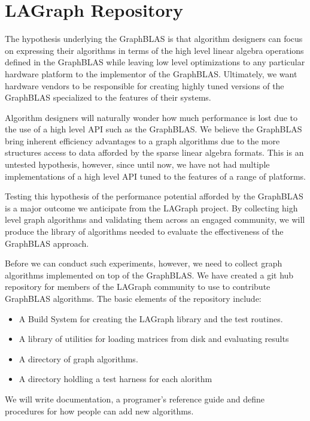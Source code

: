 \section{LAGraph Repository}
\label{sec:repo}

The hypothesis underlying the GraphBLAS is that algorithm designers can focus on expressing their algorithms
in terms of the high level linear algebra operations defined in the GraphBLAS while leaving low level
optimizations to any particular hardware platform to the implementor of the GraphBLAS.  Ultimately, 
we want hardware vendors to be responsible for creating highly tuned versions of the GraphBLAS
specialized to the features of their systems.

Algorithm designers will naturally wonder how much performance is lost due to the use of a high 
level API such as the GraphBLAS.  We believe the GraphBLAS bring inherent efficiency advantages to 
a graph algorithms due to the more structures access to data afforded by the sparse linear algebra 
formats.  This is an untested hypothesis, however, since until now, we have not had multiple 
implementations of a high level API tuned to the features of a range of platforms.

Testing this hypothesis of the performance potential afforded by the GraphBLAS is a major outcome
we anticipate from the LAGraph project.  By collecting high level graph algorithms and validating them
across an engaged community, we will produce the library of algorithms needed to evaluate the 
effectiveness of the GraphBLAS approach.

Before we can conduct such experiments, however, we need to collect graph algorithms implemented on 
top of the GraphBLAS. We have created a git hub repository for members of the LAGraph community to 
use to contribute GraphBLAS algorithms. The basic elements of the repository include:
\begin{itemize}
\item A Build System for creating the LAGraph library and the test routines.
\item A library of utilities for loading matrices from disk and evaluating results
\item A directory of graph algorithms.
\item A directory holdling a test harness for each alorithm
\end{itemize}

We will write documentation, a programer's reference guide and define procedures for how people
can add new algorithms.  
